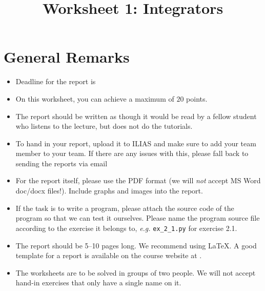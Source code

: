 




\titlehead{Simulation Methods in Physics I \hfill \semester}
\title{Worksheet 1: Integrators} 
\author{\authors}
\date{\titledate}
\publishers{Institute for Computational Physics, University of Stuttgart}

\maketitle
\tableofcontents

\section{General Remarks}
\begin{itemize}
  \item Deadline for the report is \textbf{\deadline}
  \item On this worksheet, you can achieve a maximum of $20$ points.
  \item The report should be written as though it would be read by a fellow
    student who listens to the lecture, but does not do the tutorials.
  \item To hand in your report, upload it to ILIAS and make sure to add your team member to your team. If there are any issues with this, please fall back to sending the reports via email
    \emails
  \item For the report itself, please use the PDF format (we will \emph{not} accept
    MS Word doc/docx files!). 
    Include graphs and images into the report.
  \item If the task is to write a program, please attach the source code of the
    program so that we can test it ourselves. Please name the program source file
    according to the exercise it belongs to, \textit{e.g.} \lstinline{ex_2_1.py} for exercise 2.1.
  \item The report should be 5--10 pages long. 
    We recommend using \LaTeX.
    A good template for a report is available on the course website at
    \templateurl.
  \item The worksheets are to be solved in groups of two people.
    We will not accept hand-in exercises that only have a single name on it.
\end{itemize}
